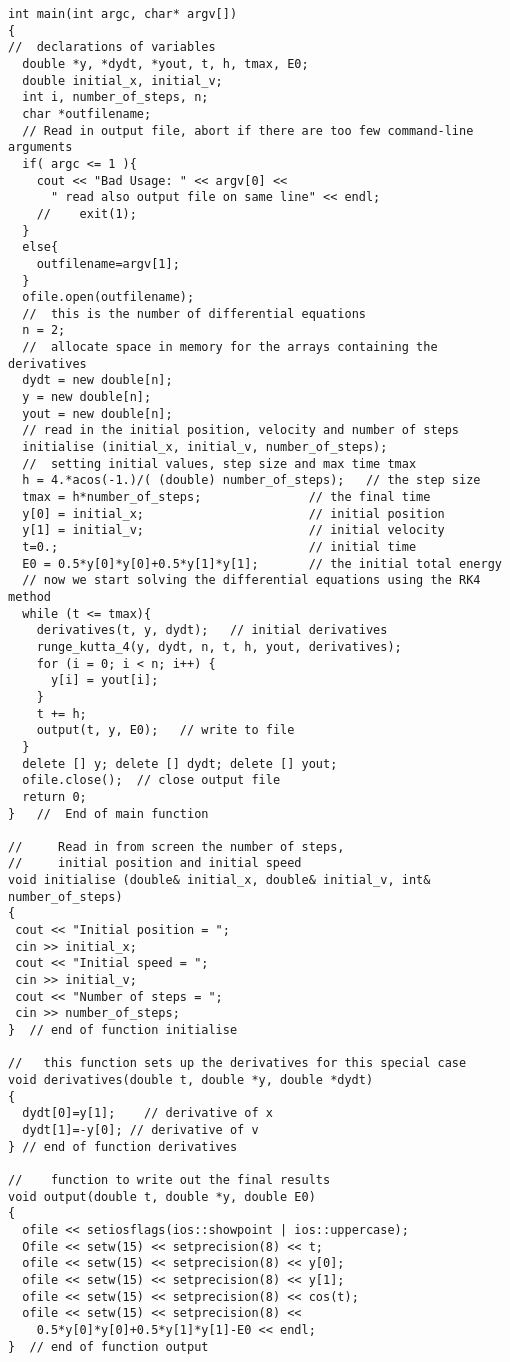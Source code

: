 \documentclass{beamer}
\begin{document}
\begin{frame}
\begin{block}{}
\begin{verbatim}
int main(int argc, char* argv[])
{
//  declarations of variables
  double *y, *dydt, *yout, t, h, tmax, E0;
  double initial_x, initial_v;
  int i, number_of_steps, n;
  char *outfilename;
  // Read in output file, abort if there are too few command-line arguments
  if( argc <= 1 ){
    cout << "Bad Usage: " << argv[0] <<
      " read also output file on same line" << endl;
    //    exit(1);
  }
  else{
    outfilename=argv[1];
  }
  ofile.open(outfilename);
  //  this is the number of differential equations  
  n = 2;     
  //  allocate space in memory for the arrays containing the derivatives 
  dydt = new double[n];
  y = new double[n];
  yout = new double[n];
  // read in the initial position, velocity and number of steps 
  initialise (initial_x, initial_v, number_of_steps);
  //  setting initial values, step size and max time tmax  
  h = 4.*acos(-1.)/( (double) number_of_steps);   // the step size     
  tmax = h*number_of_steps;               // the final time    
  y[0] = initial_x;                       // initial position  
  y[1] = initial_v;                       // initial velocity  
  t=0.;                                   // initial time      
  E0 = 0.5*y[0]*y[0]+0.5*y[1]*y[1];       // the initial total energy
  // now we start solving the differential equations using the RK4 method 
  while (t <= tmax){
    derivatives(t, y, dydt);   // initial derivatives              
    runge_kutta_4(y, dydt, n, t, h, yout, derivatives); 
    for (i = 0; i < n; i++) {
      y[i] = yout[i];  
    }
    t += h;
    output(t, y, E0);   // write to file 
  }
  delete [] y; delete [] dydt; delete [] yout;
  ofile.close();  // close output file
  return 0;
}   //  End of main function 

//     Read in from screen the number of steps,
//     initial position and initial speed 
void initialise (double& initial_x, double& initial_v, int& number_of_steps)
{
 cout << "Initial position = ";
 cin >> initial_x;
 cout << "Initial speed = ";
 cin >> initial_v;
 cout << "Number of steps = ";
 cin >> number_of_steps;
}  // end of function initialise  

//   this function sets up the derivatives for this special case  
void derivatives(double t, double *y, double *dydt)
{
  dydt[0]=y[1];    // derivative of x 
  dydt[1]=-y[0]; // derivative of v 
} // end of function derivatives  

//    function to write out the final results
void output(double t, double *y, double E0)
{
  ofile << setiosflags(ios::showpoint | ios::uppercase);
  Ofile << setw(15) << setprecision(8) << t;
  ofile << setw(15) << setprecision(8) << y[0];
  ofile << setw(15) << setprecision(8) << y[1];
  ofile << setw(15) << setprecision(8) << cos(t);
  ofile << setw(15) << setprecision(8) << 
    0.5*y[0]*y[0]+0.5*y[1]*y[1]-E0 << endl;
}  // end of function output


\end{verbatim}
\end{block}
\end{frame}
\end{document}
